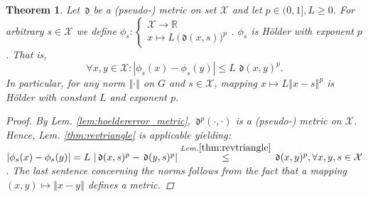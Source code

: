 \documentclass{article} %
\newtheorem{thm}{Theorem}[section]
\theoremstyle{definition}
\theoremstyle{remark}
\newcommand{\norm}[1]{\left\Vert#1\right\Vert}
\newcommand{\abs}[1]{\left\vert#1\right\vert}
\newcommand{\Real}{\mathbb R}
\newcommand{\inspace}{\ensuremath{ \mathcal X}}
\newcommand{\metric}{\, \mathfrak{d}} %
\begin{document}
\begin{thm} \label{thm:d2pmapishoelder}
Let $\metric$ be a (pseudo-) metric on set $\inspace$ and let $p \in (0,1], L \geq 0$. For arbitrary $s \in \inspace $ we define $\phi_s:\begin{cases}  \inspace \to \Real \\ x \mapsto L \, \bigl(\metric (x,s) \bigr)^p\end{cases}$.
$\phi_s $ is H\"older with exponent $p$. That is, \[\forall x,y \in \inspace : \abs{\phi_s(x) - \phi_s(y) } \leq L \, \metric (x,y)^p. \]
In particular, for any norm $\norm \cdot$ on $G$ and $s \in \inspace $, mapping $x \mapsto L \norm{x-s}^p$ is H\"older with constant $L$ and exponent $p$.

\begin{proof}
By Lem. \ref{lem:hoeldererror_metric}, $\metric^p(\cdot,\cdot)$ is a (pseudo-) metric on $\inspace$. Hence, Lem. \ref{thm:revtriangle} is applicable yielding:
$\abs{\phi_s(x) - \phi_s(y)} = L \, \abs{\metric(x,s)^p - \metric(y,s)^p} \stackrel{Lem. \ref{thm:revtriangle} } {\leq} \metric(x,y)^p, \forall x,y,s \in \inspace$. The last sentence concerning the norms follows from the fact that a mapping $(x,y) \mapsto \norm{x-y}$ defines a metric.
\end{proof}
\end{thm}
\end{document}
